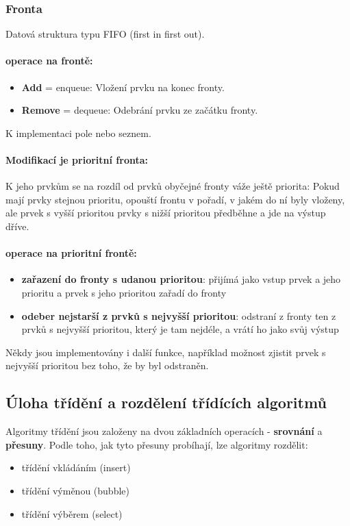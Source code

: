 \documentclass[10pt,a4paper]{article}
\begin{document}
\subsubsection{Fronta}
Datová struktura typu FIFO (first in first out).
\paragraph{operace na frontě:}
\begin{itemize}
	\item \textbf{Add} = enqueue: Vložení prvku na konec fronty.
	\item \textbf{Remove} = dequeue: Odebrání prvku ze začátku fronty.
\end{itemize}
K implementaci pole nebo seznem.
\paragraph{Modifikací je prioritní fronta:} K jeho prvkům se na rozdíl od prvků obyčejné fronty váže ještě priorita: Pokud mají prvky stejnou prioritu, opouští frontu v pořadí, v jakém do ní byly vloženy, ale prvek s vyšší prioritou prvky s nižší prioritou předběhne a jde na výstup dříve.
\paragraph{operace na prioritní frontě:}
\begin{itemize}
	\item \textbf{zařazení do fronty s udanou prioritou}: přijímá jako vstup prvek a jeho prioritu a prvek s jeho prioritou zařadí do fronty
	\item \textbf{odeber nejstarší z prvků s nejvyšší prioritou}: odstraní z fronty ten z prvků s nejvyšší prioritou, který je tam nejdéle, a vrátí ho jako svůj výstup
\end{itemize}
Někdy jsou implementovány i další funkce, například možnost zjistit prvek s nejvyšší prioritou bez toho, že by byl odstraněn.




\subsection{Úloha třídění a rozdělení třídících algoritmů}
Algoritmy třídění jsou založeny na dvou základních operacích - \textbf{srovnání} a \textbf{přesuny}. Podle toho, jak tyto přesuny probíhají, lze algoritmy rozdělit:
\begin{itemize}
	\item třídění vkládáním (insert)
	\item třídění výměnou (bubble)
	\item třídění výběrem (select)
\end{itemize}
\end{document}
